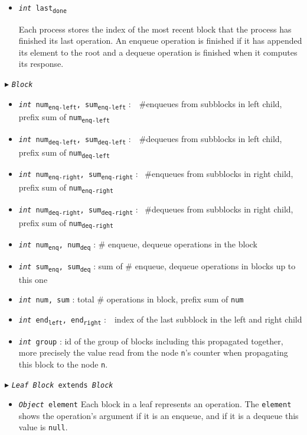 \documentclass[10pt]{article}
\newcommand{\sub}[1]{\textsubscript{#1}}
\renewcommand{\tt}[1]{\texttt{#1}}
\renewcommand{\sl}[1]{\textsl{#1}}
\theoremstyle{definition}
\begin{document}
\begin{algorithm}
\begin{algorithmic}[1]
\begin{multicols}{2}
\begin{itemize}
  \item \tt{\sl{int} \tt{last\sub{done}}}

  \textsf{Each process stores the index of the most recent block that the process has finished its last operation. An enqueue operation is finished if it has appended its element to the root and a dequeue operation is finished when it computes its response.}
  
\end{itemize}


\Statex $\blacktriangleright$ \tt{\sl{Block}}

\begin{itemize}
  \item \tt{\sl{int} num\sub{enq-left}, sum\sub{enq-left}}
  \textsf{:~~\#enqueues from subblocks in left child, prefix sum of \tt{num\sub{enq-left}}}
  \item \tt{\sl{int} num\sub{deq-left}, sum\sub{deq-left}}
  \textsf{:~~\#dequeues from subblocks in left child, prefix sum of \tt{num\sub{deq-left}}}
  \item \tt{\sl{int} num\sub{enq-right}, \tt{sum\sub{enq-right}}}
  \textsf{: ~\#enqueues from subblocks in right child, prefix sum of \tt{num\sub{enq-right}}}
  \item \tt{\sl{int} num\sub{deq-right}, \tt{sum\sub{deq-right}}}
  \textsf{: ~\#dequeues from subblocks in right child, prefix sum of \tt{num\sub{deq-right}}}
  \item \tt{\sl{int} num\sub{enq}, num\sub{deq}}
  \textsf{: \# enqueue, dequeue operations in the block}
  \item \tt{\sl{int} sum\sub{enq}, sum\sub{deq}}
  \textsf{: sum of \# enqueue, dequeue operations in blocks up to this one}
  \item \tt{\sl{int} num, sum}
  \textsf{: total \# operations in block, prefix sum of \tt{num}}
  \item \tt{\sl{int} end\sub{left}, end\sub{right}}
  \textsf{:~~index of the last subblock in the left and right child}
  \item \tt{\sl{int} group}
  \textsf{: id of the group of blocks including this propagated together, more precisely the value read from the node \tt{n}'s counter when propagating this block to the node \tt{n}.}
\end{itemize}

\pagebreak

\Statex $\blacktriangleright$ \tt{\sl{Leaf Block} extends \sl{Block}}
\begin{itemize}
  \item \tt{\sl{Object} element}
  \textsf{Each block in a leaf represents an operation. The \tt{element} shows the operation's argument if it is an enqueue, and if it is a dequeue this value is \tt{null}.}
\end{itemize}


\end{multicols}
\end{algorithmic}
\end{algorithm}
\end{document}
